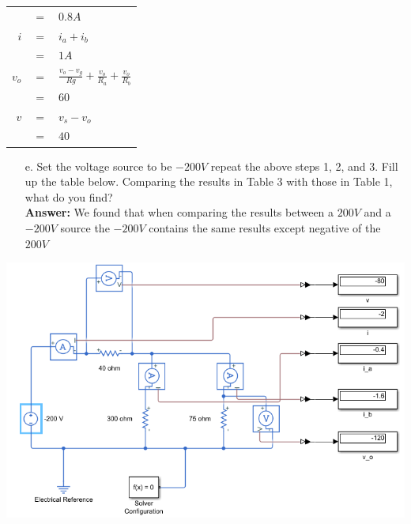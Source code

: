 \documentclass[a4paper]{article}
\begin{document}
\begin{itemize}
\begin{tabular}{rcl}
	      	        & $=$ & $0.8A$                                                                   \\
	      	$i$     & $=$ & $i_{a} + i_{b}$                                                          \\
	      	        & $=$ & $1A$                                                                     \\
	      	$v_{o}$ & $=$ & $\frac{v_{o} - v_{g}}{R{g}} + \frac{v_{o}}{R_{a}} + \frac{v_{o}}{R_{b}}$ \\
	      	        & $=$ & $60$                                                                     \\
	      	$v$     & $=$ & $v_{s} - v_{o}$                                                          \\
	      	        & $=$ & $40$                                                                     \\
	      \end{tabular}
	      \begin{itemize}
	      	\item[e.] Set the voltage source to be $-200V$ repeat the above steps 1, 2, and 3. Fill up the table below. Comparing the results in Table 3 with those in Table 1, what do you find? \\
	      	      \textbf{Answer:} We found that when comparing the results between a $200V$ and a $-200V$ source the $-200V$ contains the same results except negative of the $200V$
	      \end{itemize}
	      \includegraphics[scale=0.5]{circuit-1-200.png} \\
	      \begin{tabular}{|c|c|c|}
	      	\hline

\end{tabular}
\end{itemize}
\end{document}
